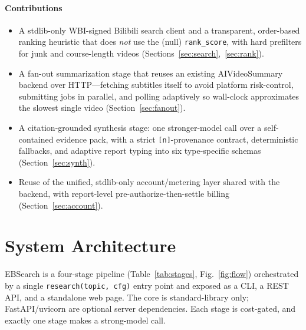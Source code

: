 \documentclass[conference]{IEEEtran}
\begin{document}
\paragraph{Contributions}
\begin{itemize}
  \item A stdlib-only WBI-signed Bilibili search client and a transparent,
  order-based ranking heuristic that does \emph{not} use the (null)
  \texttt{rank\_score}, with hard prefilters for junk and course-length videos
  (Sections~\ref{sec:search},~\ref{sec:rank}).
  \item A fan-out summarization stage that reuses an existing AIVideoSummary
  backend over HTTP---fetching subtitles itself to avoid platform risk-control,
  submitting jobs in parallel, and polling adaptively so wall-clock approximates
  the slowest single video (Section~\ref{sec:fanout}).
  \item A citation-grounded synthesis stage: one stronger-model call over a
  self-contained evidence pack, with a strict \texttt{[n]}-provenance contract,
  deterministic fallbacks, and adaptive report typing into six type-specific
  schemas (Section~\ref{sec:synth}).
  \item Reuse of the unified, stdlib-only account/metering layer shared with the
  backend, with report-level pre-authorize-then-settle billing
  (Section~\ref{sec:account}).
\end{itemize}

\section{System Architecture}
\label{sec:arch}

EBSearch is a four-stage pipeline (Table~\ref{tab:stages}, Fig.~\ref{fig:flow})
orchestrated by a single \texttt{research(topic, cfg)} entry point and exposed as
a CLI, a REST API, and a standalone web page. The core is standard-library only;
FastAPI/uvicorn are optional server dependencies. Each stage is cost-gated, and
exactly one stage makes a strong-model call.
\end{document}

